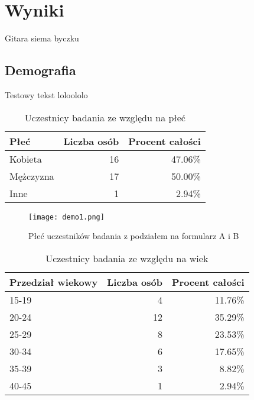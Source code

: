 \graphicspath{{chapters/chapter7/imgs/}}

\chapter{Wyniki}\label{chapter:ch7}

Gitara siema byczku

\section{Demografia}\label{section:ch7_1}

Testowy tekst loloololo

\begin{table}[h!]
    \begin{center}
        \begin{tabular}{|l|r|r|}
            \hline
            Płeć      & Liczba osób & Procent całości \\
            \hline
            Kobieta   & 16          & 47.06\%         \\
            Mężczyzna & 17          & 50.00\%         \\
            Inne      & 1           & 2.94\%          \\
            \hline
        \end{tabular}
    \end{center}
    \caption{Uczestnicy badania ze względu na płeć}\label{tab1:ch7_1}
\end{table}

\begin{figure}[h!]
    \centering
    \texttt{[image: demo1.png]}
    \caption{Płeć uczestników badania z podziałem na formularz A i B}
    \label{fig:ch7_demo1}
\end{figure}

\begin{table}[h!]
    \begin{center}
        \begin{tabular}{|l|r|r|}
            \hline
            Przedział wiekowy & Liczba osób & Procent całości \\
            \hline
            15-19             & 4           & 11.76\%         \\
            20-24             & 12          & 35.29\%         \\
            25-29             & 8           & 23.53\%         \\
            30-34             & 6           & 17.65\%         \\
            35-39             & 3           & 8.82\%          \\
            40-45             & 1           & 2.94\%          \\
            \hline
        \end{tabular}
    \end{center}
    \caption{Uczestnicy badania ze względu na wiek}\label{tab1:ch7_2}
\end{table}

